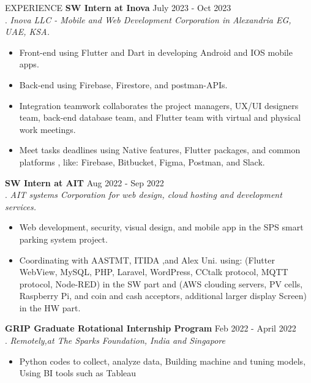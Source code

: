 \documentclass{resume} %
\begin{document}


 \begin{rSection}{EXPERIENCE}
 \textbf{SW Intern at Inova} \hfill  July 2023 - Oct 2023\\
  .	 \hfill \textit{Inova LLC - Mobile and Web Development Corporation in Alexandria EG, UAE, KSA.}
  \begin{itemize}
     \itemsep -3pt {} 
      \item Front-end using Flutter and Dart in developing Android and IOS mobile apps.
      \item Back-end using Firebase, Firestore, and postman-APIs.
      \item Integration teamwork collaborates the project managers, UX/UI designers team, back-end database team, and Flutter team with virtual and physical work meetings.
      \item  Meet tasks deadlines using Native features, Flutter packages, and common platforms , like: Firebase, Bitbucket, Figma, Postman, and Slack.
 \end{itemize}

 \textbf{SW Intern at AIT} \hfill  Aug 2022 - Sep 2022\\
  .	 \hfill \textit{AIT systems Corporation for web design, cloud hosting and development services.}
  \begin{itemize}
     \itemsep -3pt {} 
      \item Web development, security, visual design, and mobile app in the SPS smart parking system project.
      \item Coordinating with AASTMT, ITIDA ,and Alex Uni. using: (Flutter WebView, MySQL, PHP, Laravel, WordPress, CCtalk protocol, MQTT protocol, Node-RED) in the SW part and (AWS clouding servers, PV cells, Raspberry Pi, and coin and cash acceptors, additional larger display Screen) in the HW part.
 \end{itemize}


 \textbf{GRIP Graduate Rotational Internship Program} \hfill  Feb 2022 - April 2022\\
  .	 \hfill \textit{Remotely,at The Sparks Foundation, India and Singapore}
  \begin{itemize}
     \itemsep -3pt {} 
      \item Python codes to collect, analyze data, Building machine and tuning models, Using BI tools such as Tableau
 \end{itemize}
 

\end{rSection}
\end{document}
